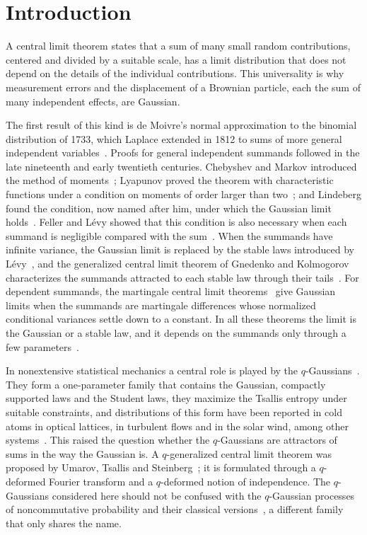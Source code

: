 \documentclass[aip,jmp,preprint,onecolumn,floatfix,superscriptaddress,nofootinbib,11pt]{revtex4-2}
\theoremstyle{plain}
\theoremstyle{remark}
\numberwithin{equation}{section}
\begin{document}
\maketitle
 
\section{Introduction}\label{sec:intro}
 
A central limit theorem states that a sum of many small random contributions, centered and divided by a suitable scale, has a limit distribution that does not depend on the details of the individual contributions. This universality is why measurement errors and the displacement of a Brownian particle, each the sum of many independent effects, are Gaussian.
 
The first result of this kind is de Moivre's normal approximation to the binomial distribution of 1733, which Laplace extended in 1812 to sums of more general independent variables~\cite{Fischer}. Proofs for general independent summands followed in the late nineteenth and early twentieth centuries. Chebyshev and Markov introduced the method of moments~\cite{Fischer}; Lyapunov proved the theorem with characteristic functions under a condition on moments of order larger than two~\cite{Lyapunov}; and Lindeberg found the condition, now named after him, under which the Gaussian limit holds~\cite{Lindeberg}. Feller and L\'evy showed that this condition is also necessary when each summand is negligible compared with the sum~\cite{Feller1936,Levy1937}. When the summands have infinite variance, the Gaussian limit is replaced by the stable laws introduced by L\'evy~\cite{Levy1937}, and the generalized central limit theorem of Gnedenko and Kolmogorov characterizes the summands attracted to each stable law through their tails~\cite{GK}. For dependent summands, the martingale central limit theorems~\cite{Brown1971,McLeish1974} give Gaussian limits when the summands are martingale differences whose normalized conditional variances settle down to a constant. In all these theorems the limit is the Gaussian or a stable law, and it depends on the summands only through a few parameters~\cite{Feller}.
 
In nonextensive statistical mechanics a central role is played by the $q$-Gaussians~\cite{Tsallis1988,Tsallis}. They form a one-parameter family that contains the Gaussian, compactly supported laws and the Student laws, they maximize the Tsallis entropy under suitable constraints, and distributions of this form have been reported in cold atoms in optical lattices, in turbulent flows and in the solar wind, among other systems~\cite{Tsallis}. This raised the question whether the $q$-Gaussians are attractors of sums in the way the Gaussian is. A $q$-generalized central limit theorem was proposed by Umarov, Tsallis and Steinberg~\cite{UTS2008}; it is formulated through a $q$-deformed Fourier transform and a $q$-deformed notion of independence. The $q$-Gaussians considered here should not be confused with the $q$-Gaussian processes of noncommutative probability and their classical versions~\cite{Bryc2001}, a different family that only shares the name.
 
\end{document}
